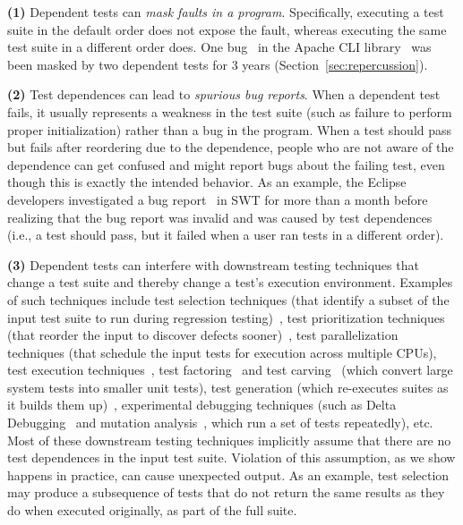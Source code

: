 \textbf{(1)}
Dependent tests can
\emph{mask faults in a program}. Specifically, executing a test suite in the
default order does not expose the fault, whereas
executing the same test suite in a different order does. 
One bug~\cite{clibug} in the Apache CLI library~\cite{cli}
was been masked by two dependent tests
for 3 years (Section~\ref{sec:repercussion}).

\textbf{(2)}
Test dependences can lead to \emph{spurious bug reports}.
When a dependent test fails, it usually represents
a weakness in the test
suite (such as failure to perform proper initialization) rather than a bug
in the program. 
When a test should pass but
fails after reordering due to the dependence,
people who are not aware of the dependence can get confused
and might report bugs about the failing test,
even though this is exactly the intended behavior.
%
As an example, the Eclipse developers
investigated a bug report~\cite{eclipsebug} in SWT for
more than a month before realizing that the 
bug report was invalid and was caused by test dependences
(i.e., a test should pass, but it failed when a user
ran tests in a different order).
%



\textbf{(3)}
Dependent tests can interfere with downstream testing
techniques that change a test suite and thereby change a test's execution environment.
Examples of such techniques include
test selection techniques (that identify a subset of
the input test suite to run during
regression testing)~\cite{harroldetal:OOPSLA:2001},
test prioritization techniques (that reorder the
input to discover defects sooner)~\cite{Elbaum:2000:PTC:347324.348910},
test parallelization techniques (that schedule the input tests for execution across multiple
CPUs), test execution techniques~\cite{Misailovic:2007, SPLAT},
test factoring~\cite{Saff:2005} and test carving~\cite{Elbaum:2006} (which
convert large system tests into smaller unit tests),
test generation (which re-executes suites as it builds them up)~\cite{PachecoE2005,RobinsonEPAL2011},
experimental debugging techniques (such as Delta
Debugging~\cite{Zeller:2002} and mutation analysis~\cite{Schuler:2009:EMT},
which run a set of tests repeatedly), etc. 
Most of these downstream testing techniques implicitly assume that
there are no test dependences in the input test suite. Violation of
this assumption, as we show happens in practice, can cause unexpected
output. %
As an example, test selection may produce a subsequence of tests that do not
return the same results as they do when executed originally, as part of the full suite.


